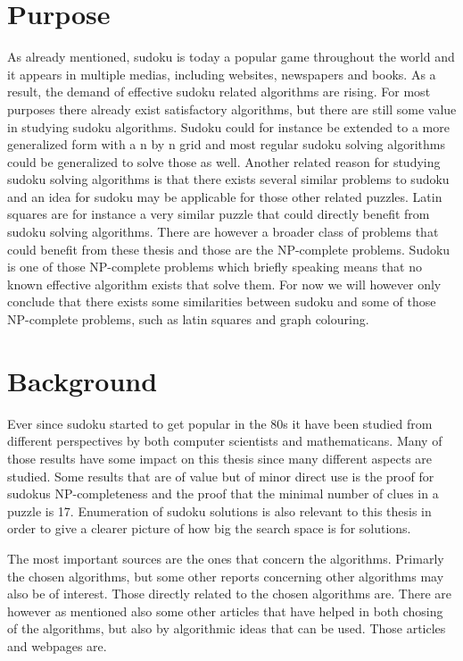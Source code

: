 \documentclass[a4paper,11pt]{kth-mag}
\begin{document}
\section{Purpose}
As already mentioned, sudoku is today a popular game throughout the world and it appears 
in multiple medias, including websites, newspapers and books. 
As a result, the demand of effective sudoku related algorithms are rising. 
For most purposes there already exist satisfactory algorithms, but there are 
still some value in studying sudoku algorithms. 
Sudoku could for instance be extended to a more generalized form with 
a n by n grid and most regular sudoku solving algorithms could be generalized 
to solve those as well. 
Another related reason for studying sudoku solving algorithms is that there exists 
several similar problems to sudoku and an idea for sudoku may be applicable for 
those other related puzzles. 
Latin squares are for instance a very similar puzzle that could directly benefit 
from sudoku solving algorithms. 
There are however a broader class of problems that could benefit from these thesis 
and those are the NP-complete problems. 
Sudoku is one of those NP-complete problems \cite{complexity} which briefly speaking means that 
no known effective algorithm exists that solve them. 
For now we will however only conclude that there exists some similarities between 
sudoku and some of those NP-complete problems, such as latin squares and graph colouring. 

\section{Background}
Ever since sudoku started to get popular in the 80s it have been studied from different perspectives by both computer scientists and mathematicans. Many of those results have some impact on this thesis since many different aspects are studied. Some results that are of value but of minor direct use is the proof for sudokus NP-completeness \cite{complexity} and the proof that the minimal number of clues in a puzzle is 17. \cite{17clueProof} Enumeration of sudoku solutions is also relevant to this thesis in order to give a clearer picture of how big the search space is for solutions. \cite{enumeration} 

The most important sources are the ones that concern the algorithms. Primarly the chosen algorithms, but some other reports concerning other algorithms may also be of interest. Those directly related to the chosen algorithms are. \cite{techniques,boltzmann,stochastic,review} There are however as mentioned also some other articles that have helped in both chosing of the algorithms, but also by algorithmic ideas that can be used. Those articles and webpages are. \cite{discrepancySearch,culturalSwarms,culturalSwarms}
\end{document}
